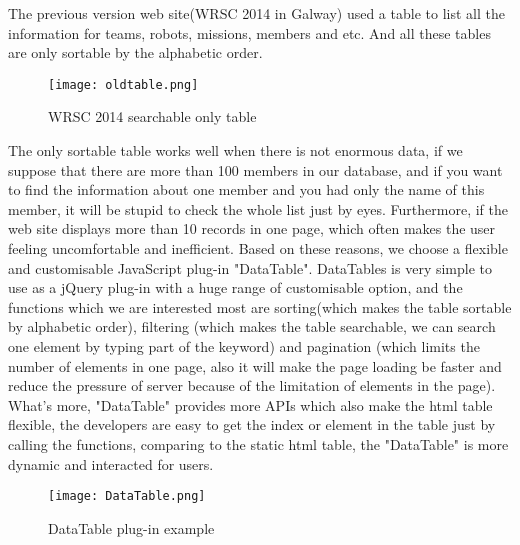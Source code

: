 The previous version web site(WRSC 2014 in Galway) used a table to list all the information for teams, robots, missions, members and etc. And all these tables are only sortable by the alphabetic order.
\begin{figure}[h!]
\centering
\texttt{[image: oldtable.png]}
\caption{WRSC 2014 searchable only table }
\label{fig-sample}
\end{figure}
The only sortable table works well when there is not enormous data, if we suppose that there are more than 100 members in our database, and if you want to find the information about one member and you had only the name of this member, it will be stupid to check the whole list just by eyes. Furthermore, if the web site displays more than 10 records in one page, which often makes the user feeling uncomfortable and inefficient. Based on these reasons, we choose a flexible and customisable JavaScript plug-in "DataTable". DataTables is very simple to use as a jQuery plug-in with a huge range of customisable option, and the functions which we are interested most are sorting(which makes the table sortable by alphabetic order), filtering (which makes the table searchable, we can search one element by typing part of the keyword) and pagination (which limits the number of elements in one page, also it will make the page loading be faster and reduce the pressure of server because of the limitation of elements in the page). What's more, "DataTable" provides more APIs which also make the html table flexible, the developers are easy to get the index or element in the table just by calling the functions, comparing to the static html table, the "DataTable" is more dynamic and interacted for users.
\begin{figure}[h!]
\centering
\texttt{[image: DataTable.png]}
\caption{DataTable plug-in example }
\label{fig-sample}
\end{figure}

